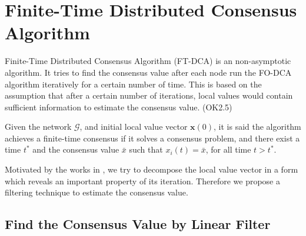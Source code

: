 
\section{\label{sec:Finite-Time-Distributed-Consensu}Finite-Time Distributed
Consensus Algorithm}

Finite-Time Distributed Consensus Algorithm (FT-DCA) is an non-asymptotic
algorithm. It tries to find the consensus value after each node run
the FO-DCA algorithm iteratively for a certain number of time. This
is based on the assumption that after a certain number of iterations,
local values would contain sufficient information to estimate the
consensus value. (OK2.5)
\begin{defn}
Given the network $\mathcal{G}$, and initial local value vector $\mathbf{x}\left(0\right)$,
it is said the algorithm achieves a finite-time consensus if it solves
a consensus problem, and there exist a time $t^{*}$ and the consensus
value $\bar{x}$ such that $x_{i}\left(t\right)=\bar{x}$, for all
time $t>t^{*}$. 
\end{defn}
Motivated by the works in \cite{Kokiopoulou2007}, we try to decompose
the local value vector in a form which reveals an important property
of its iteration. Therefore we propose a filtering technique to estimate
the consensus value. 


\subsection{\label{sub:Find_Consensus_Value}Find the Consensus Value by Linear
Filter}

